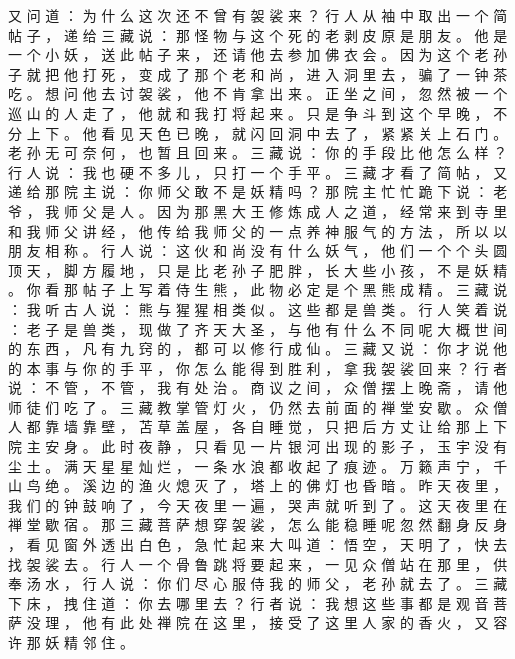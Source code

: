 {又 问 道 ： 为 什 么 这 次 还 不 曾 有 袈 裟 来 ？ 行 人 从 袖 中 取 出 一 个 简 帖 子 ， 递 给 三 藏 说 ： 那 怪 物 与 这 个 死 的 老 剥 皮 原 是 朋 友 。
他 是 一 个 小 妖 ， 送 此 帖 子 来 ， 还 请 他 去 参 加 佛 衣 会 。
因 为 这 个 老 孙 子 就 把 他 打 死 ， 变 成 了 那 个 老 和 尚 ， 进 入 洞 里 去 ， 骗 了 一 钟 茶 吃 。
想 问 他 去 讨 袈 裟 ， 他 不 肯 拿 出 来 。
正 坐 之 间 ， 忽 然 被 一 个 巡 山 的 人 走 了 ， 他 就 和 我 打 将 起 来 。
只 是 争 斗 到 这 个 早 晚 ， 不 分 上 下 。
他 看 见 天 色 已 晚 ， 就 闪 回 洞 中 去 了 ， 紧 紧 关 上 石 门 。
老 孙 无 可 奈 何 ， 也 暂 且 回 来 。
三 藏 说 ： 你 的 手 段 比 他 怎 么 样 ？ 行 人 说 ： 我 也 硬 不 多 儿 ， 只 打 一 个 手 平 。
三 藏 才 看 了 简 帖 ， 又 递 给 那 院 主 说 ： 你 师 父 敢 不 是 妖 精 吗 ？ 那 院 主 忙 忙 跪 下 说 ： 老 爷 ， 我 师 父 是 人 。
因 为 那 黑 大 王 修 炼 成 人 之 道 ， 经 常 来 到 寺 里 和 我 师 父 讲 经 ， 他 传 给 我 师 父 的 一 点 养 神 服 气 的 方 法 ， 所 以 以 朋 友 相 称 。
行 人 说 ： 这 伙 和 尚 没 有 什 么 妖 气 ， 他 们 一 个 个 头 圆 顶 天 ， 脚 方 履 地 ， 只 是 比 老 孙 子 肥 胖 ， 长 大 些 小 孩 ， 不 是 妖 精 。
你 看 那 帖 子 上 写 着 侍 生 熊 ， 此 物 必 定 是 个 黑 熊 成 精 。
三 藏 说 ： 我 听 古 人 说 ： 熊 与 猩 猩 相 类 似 。
这 些 都 是 兽 类 。
行 人 笑 着 说 ： 老 子 是 兽 类 ， 现 做 了 齐 天 大 圣 ， 与 他 有 什 么 不 同 呢 大 概 世 间 的 东 西 ， 凡 有 九 窍 的 ， 都 可 以 修 行 成 仙 。
三 藏 又 说 ： 你 才 说 他 的 本 事 与 你 的 手 平 ， 你 怎 么 能 得 到 胜 利 ， 拿 我 袈 裟 回 来 ？ 行 者 说 ： 不 管 ， 不 管 ， 我 有 处 治 。
商 议 之 间 ， 众 僧 摆 上 晚 斋 ， 请 他 师 徒 们 吃 了 。
三 藏 教 掌 管 灯 火 ， 仍 然 去 前 面 的 禅 堂 安 歇 。
众 僧 人 都 靠 墙 靠 壁 ， 苫 草 盖 屋 ， 各 自 睡 觉 ， 只 把 后 方 丈 让 给 那 上 下 院 主 安 身 。
此 时 夜 静 ， 只 看 见 一 片 银 河 出 现 的 影 子 ， 玉 宇 没 有 尘 土 。
满 天 星 星 灿 烂 ， 一 条 水 浪 都 收 起 了 痕 迹 。
万 籁 声 宁 ， 千 山 鸟 绝 。
溪 边 的 渔 火 熄 灭 了 ， 塔 上 的 佛 灯 也 昏 暗 。
昨 天 夜 里 ， 我 们 的 钟 鼓 响 了 ， 今 天 夜 里 一 遍 ， 哭 声 就 听 到 了 。
这 天 夜 里 在 禅 堂 歇 宿 。
那 三 藏 菩 萨 想 穿 袈 裟 ， 怎 么 能 稳 睡 呢 忽 然 翻 身 反 身 ， 看 见 窗 外 透 出 白 色 ， 急 忙 起 来 大 叫 道 ： 悟 空 ， 天 明 了 ， 快 去 找 袈 裟 去 。
行 人 一 个 骨 鲁 跳 将 要 起 来 ， 一 见 众 僧 站 在 那 里 ， 供 奉 汤 水 ， 行 人 说 ： 你 们 尽 心 服 侍 我 的 师 父 ， 老 孙 就 去 了 。
三 藏 下 床 ， 拽 住 道 ： 你 去 哪 里 去 ？ 行 者 说 ： 我 想 这 些 事 都 是 观 音 菩 萨 没 理 ， 他 有 此 处 禅 院 在 这 里 ， 接 受 了 这 里 人 家 的 香 火 ， 又 容 许 那 妖 精 邻 住 。
}
